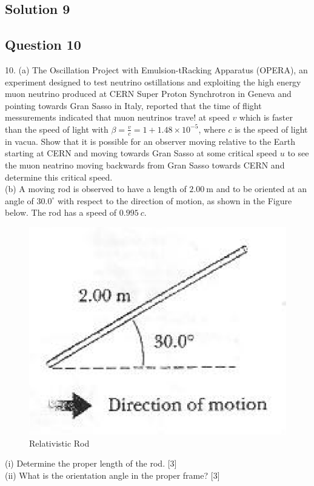 \documentclass{article}
\begin{document}
\subsection{Solution 9}

\subsection{Question 10}
10. (a) The Oscillation Project with Emulsion-tRacking Apparatus (OPERA), an experiment designed to test neutrino ostillations and exploiting the high energy muon neutrino produced at CERN Super Proton Synchrotron in Geneva and pointing towards Gran Sasso in Italy, reported that the time of flight messurements indicated that muon neutrinos trave! at speed $v$ which is faster than the speed of light with $\beta=\frac{v}{c}=1+1.48 \times 10^{-5}$, where $c$ is the speed of light in vacua. Show that it is possible for an observer moving relative to the Earth starting at CERN and moving towards Gran Sasso at some critical speed $u$ to see the muon neatrino moving backwards from Gran Sasso towards CERN and determine this critical speed.\\
(b) A moving rod is observed to have a length of $2.00 \mathrm{~m}$ and to be oriented at an angle of $30.0^\circ$ with respect to the direction of motion, as shown in the Figure below. The rod has a speed of $0.995~c$.
\begin{figure}
	\centering
	\includegraphics[width=0.7\linewidth]{spho_book_TYS_images/2011q10.png}
	\caption{Relativistic Rod}
\end{figure}
(i) Determine the proper length of the rod. [3] \\
(ii) What is the orientation angle in the proper frame? [3] \\
\end{document}
